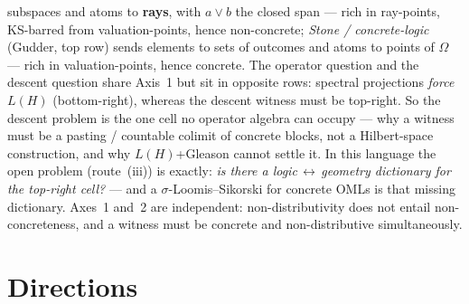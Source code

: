 \documentclass[11pt,reqno]{amsart}
\theoremstyle{plain}
\theoremstyle{definition}
\theoremstyle{remark}
\begin{document}
subspaces and atoms to \textbf{rays}, with $a\vee b$ the closed span --- rich in
ray-points, KS-barred from valuation-points, hence non-concrete; \emph{Stone /
concrete-logic} (Gudder, top row) sends elements to sets of outcomes and atoms to
points of $\Omega$ --- rich in valuation-points, hence concrete. The operator
question and the descent question share Axis~1 but sit in opposite rows: spectral
projections \emph{force} $L(H)$ (bottom-right), whereas the descent witness must be
top-right. So the descent problem is the one cell no operator algebra can occupy ---
why a witness must be a pasting / countable colimit of concrete blocks, not a
Hilbert-space construction, and why $L(H)$+Gleason cannot settle it. In this language
the open problem (route~(iii)) is exactly: \emph{is there a
logic\,$\leftrightarrow$\,geometry dictionary for the top-right cell?} --- and a
$\sigma$-Loomis--Sikorski for concrete OMLs is that missing dictionary. Axes~1 and~2
are independent: non-distributivity does not entail non-concreteness, and a witness
must be concrete and non-distributive simultaneously.

\section{Directions}
\label{sec:first}
\end{document}
